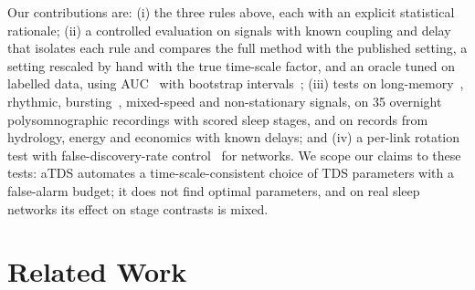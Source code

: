 \documentclass[11pt,a4paper]{article}
\begin{document}
Our contributions are: (i) the three rules above, each with an explicit statistical rationale; (ii) a controlled evaluation on signals with known coupling and delay that isolates each rule and compares the full method with the published setting, a setting rescaled by hand with the true time-scale factor, and an oracle tuned on labelled data, using AUC~\cite{Hanley1982MeaningUse} with bootstrap intervals~\cite{Efron1979BootstrapMethods}; (iii) tests on long-memory~\cite{Davies1987TestsHurst,Peng1995QuantificationScaling}, rhythmic, bursting~\cite{Rulkov2002ModelingSpikingbursting}, mixed-speed and non-stationary signals, on 35 overnight polysomnographic recordings with scored sleep stages, and on records from hydrology, energy and economics with known delays; and (iv) a per-link rotation test with false-discovery-rate control~\cite{Benjamini1995ControllingFalse} for networks. We scope our claims to these tests: aTDS automates a time-scale-consistent choice of TDS parameters with a false-alarm budget; it does not find optimal parameters, and on real sleep networks its effect on stage contrasts is mixed.

\section{Related Work}
\label{sec:related_work}
\end{document}
